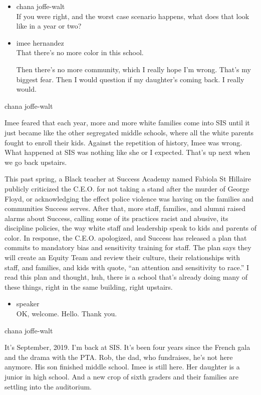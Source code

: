 \begin{itemize}
\item
  chana joffe-walt\\
  If you were right, and the worst case scenario happens, what does that
  look like in a year or two?
\item
  imee hernandez\\
  That there's no more color in this school.

  Then there's no more community, which I really hope I'm wrong. That's
  my biggest fear. Then I would question if my daughter's coming back. I
  really would.
\end{itemize}

chana joffe-walt

Imee feared that each year, more and more white families come into SIS
until it just became like the other segregated middle schools, where all
the white parents fought to enroll their kids. Against the repetition of
history, Imee was wrong. What happened at SIS was nothing like she or I
expected. That's up next when we go back upstairs.

This past spring, a Black teacher at Success Academy named Fabiola St
Hillaire publicly criticized the C.E.O. for not taking a stand after the
murder of George Floyd, or acknowledging the effect police violence was
having on the families and communities Success serves. After that, more
staff, families, and alumni raised alarms about Success, calling some of
its practices racist and abusive, its discipline policies, the way white
staff and leadership speak to kids and parents of color. In response,
the C.E.O. apologized, and Success has released a plan that commits to
mandatory bias and sensitivity training for staff. The plan says they
will create an Equity Team and review their culture, their relationships
with staff, and families, and kids with quote, ``an attention and
sensitivity to race.'' I read this plan and thought, huh, there is a
school that's already doing many of these things, right in the same
building, right upstairs.

\begin{itemize}
\tightlist
\item
  speaker\\
  OK, welcome. Hello. Thank you.
\end{itemize}

chana joffe-walt

It's September, 2019. I'm back at SIS. It's been four years since the
French gala and the drama with the PTA. Rob, the dad, who fundraises,
he's not here anymore. His son finished middle school. Imee is still
here. Her daughter is a junior in high school. And a new crop of sixth
graders and their families are settling into the auditorium.

